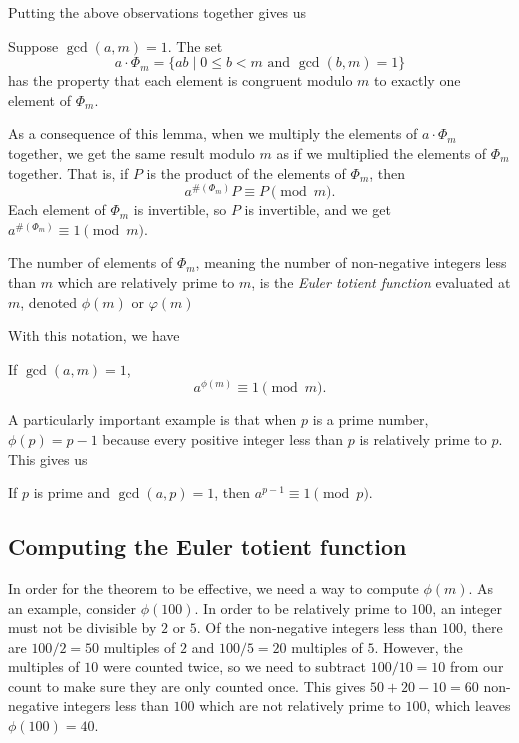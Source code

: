 Putting the above observations together gives us
\begin{lemma}
Suppose $\gcd(a,m) = 1$. The set
\begin{equation*}
a\cdot\Phi_m = \{ab\mid 0\leq b < m\text{ and }\gcd(b,m) = 1\}
\end{equation*}
has the property that each element is congruent modulo $m$ to exactly one element of $\Phi_m$.
\end{lemma}

As a consequence of this lemma, when we multiply the elements of $a\cdot\Phi_m$ together, we get the same result modulo $m$ as if we multiplied the elements of $\Phi_m$ together. That is, if $P$ is the product of the elements of $\Phi_m$, then
\begin{equation*}
a^{\#(\Phi_m)}P\equiv P\pmod{m}.
\end{equation*}
Each element of $\Phi_m$ is invertible, so $P$ is invertible, and we get $a^{\#(\Phi_m)}\equiv 1\pmod{m}$.

\begin{definition}
The number of elements of $\Phi_m$, meaning the number of non-negative integers less than $m$ which are relatively prime to $m$, is the \emph{Euler totient function} evaluated at $m$, denoted $\phi(m)$ or $\varphi(m)$
\end{definition}

With this notation, we have
\begin{theorem}
If $\gcd(a,m) = 1$,
\begin{equation*}
a^{\phi(m)}\equiv 1\pmod{m}.
\end{equation*}
\end{theorem}

A particularly important example is that when $p$ is a prime number, $\phi(p) = p - 1$ because every positive integer less than $p$ is relatively prime to $p$. This gives us
\begin{theorem}
If $p$ is prime and $\gcd(a,p) = 1$, then $a^{p - 1}\equiv 1\pmod{p}$.
\end{theorem}


\subsection{Computing the Euler totient function}

In order for the theorem to be effective, we need a way to compute $\phi(m)$. As an example, consider $\phi(100)$. In order to be relatively prime to $100$, an integer must not be divisible by $2$ or $5$. Of the non-negative integers less than $100$, there are $100/2 = 50$ multiples of $2$ and $100/5 = 20$ multiples of $5$. However, the multiples of $10$ were counted twice, so we need to subtract $100/10 = 10$ from our count to make sure they are only counted once. This gives $50 + 20 - 10 = 60$ non-negative integers less than $100$ which are not relatively prime to $100$, which leaves $\phi(100) = 40$.

